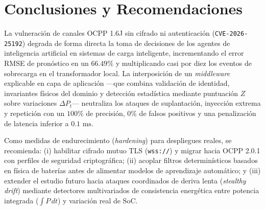 \documentclass[conference]{IEEEtran}
\begin{document}
\FloatBarrier
\section{Conclusiones y Recomendaciones}
\label{sec:conclusiones}

La vulneración de canales OCPP 1.6J sin cifrado ni autenticación (\texttt{CVE-2026-25192}) degrada de forma directa la toma de decisiones de los agentes de inteligencia artificial en sistemas de carga inteligente, incrementando el error RMSE de pronóstico en un $66.49\%$ y multiplicando casi por diez los eventos de sobrecarga en el transformador local. La interposición de un \textit{middleware} explicable en capa de aplicación ---que combina validación de identidad, invariantes físicos del dominio y detección estadística mediante puntuación $Z$ sobre variaciones $\Delta P_t$--- neutraliza los ataques de suplantación, inyección extrema y repetición con un $100\%$ de precisión, $0\%$ de falsos positivos y una penalización de latencia inferior a $0.1\text{ ms}$.

Como medidas de endurecimiento (\textit{hardening}) para despliegues reales, se recomienda: (i) habilitar cifrado mutuo TLS (\texttt{wss://}) y migrar hacia OCPP 2.0.1 con perfiles de seguridad criptográfica; (ii) acoplar filtros determinísticos basados en física de baterías antes de alimentar modelos de aprendizaje automático; y (iii) extender el estudio futuro hacia ataques coordinados de deriva lenta (\textit{stealthy drift}) mediante detectores multivariados de consistencia energética entre potencia integrada ($\int P\,dt$) y variación real de $\text{SoC}$.
\end{document}
